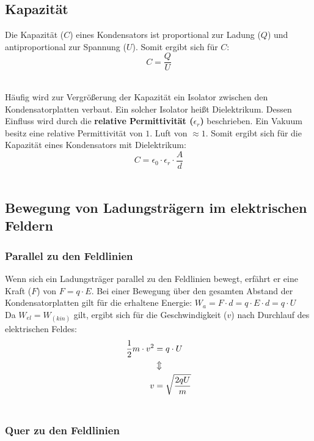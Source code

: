 \documentclass[a4paper]{article}
\begin{document}
\subsection{Kapazität}

Die Kapazität ($C$) eines Kondensators ist proportional zur Ladung ($Q$) und antiproportional zur Spannung ($U$).
Somit ergibt sich für $C$:
\Large$$C = \dfrac{Q}{U}$$\\ \normalsize

Häufig wird zur Vergrößerung der Kapazität ein Isolator zwischen den Kondensatorplatten verbaut. Ein solcher Isolator
heißt Dielektrikum. Dessen Einfluss wird durch die \textbf{relative Permittivität ($\epsilon_r$)} beschrieben. Ein Vakuum besitz eine
relative Permittivität von $1$. Luft von $\approx 1$. Somit ergibt sich für die Kapazität eines Kondensators mit
Dielektrikum:\\
\Large$$C = \epsilon_0 \cdot \epsilon_r \cdot \dfrac{A}{d}$$\\ \normalsize



\newpage
\subsection{Bewegung von Ladungsträgern im elektrischen Feldern}
\subsubsection{Parallel zu den Feldlinien}

Wenn sich ein Ladungsträger parallel zu den Feldlinien bewegt, erfährt er eine Kraft ($F$) von $F = q \cdot E$.
Bei einer Bewegung über den gesamten Abstand der Kondensatorplatten gilt für die erhaltene Energie:
$W_a = F \cdot d = q \cdot E \cdot d = q \cdot U$\\
Da $W_{el} = W_(kin)$ gilt, ergibt sich für die Geschwindigkeit ($v$) nach Durchlauf des elektrischen
Feldes:\\
\begin{align*}
	\small \frac{1}{2}m \cdot v^2 &= q \cdot U\\
	 &\Updownarrow\\
	\Large v &= \sqrt{\dfrac{2qU}{m}}\\ \normalsize
\end{align*}



\subsubsection{Quer zu den Feldlinien}
\end{document}
